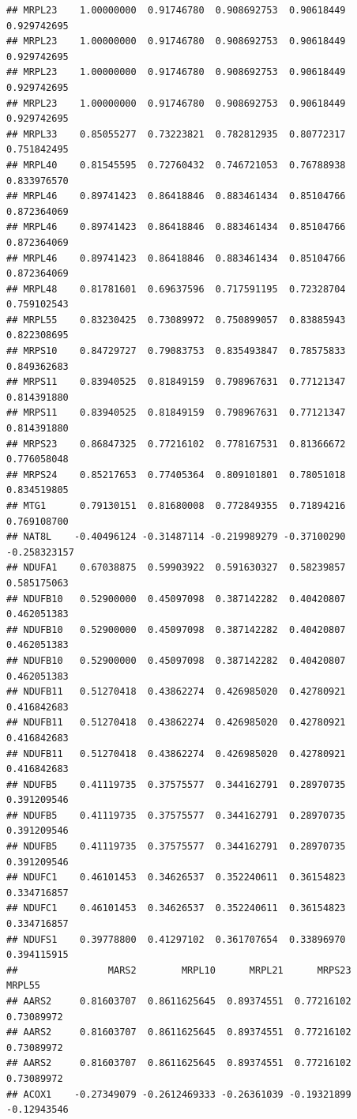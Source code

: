 \documentclass[
]{article}
\begin{document}
\begin{verbatim}
## MRPL23    1.00000000  0.91746780  0.908692753  0.90618449  0.929742695
## MRPL23    1.00000000  0.91746780  0.908692753  0.90618449  0.929742695
## MRPL23    1.00000000  0.91746780  0.908692753  0.90618449  0.929742695
## MRPL23    1.00000000  0.91746780  0.908692753  0.90618449  0.929742695
## MRPL33    0.85055277  0.73223821  0.782812935  0.80772317  0.751842495
## MRPL40    0.81545595  0.72760432  0.746721053  0.76788938  0.833976570
## MRPL46    0.89741423  0.86418846  0.883461434  0.85104766  0.872364069
## MRPL46    0.89741423  0.86418846  0.883461434  0.85104766  0.872364069
## MRPL46    0.89741423  0.86418846  0.883461434  0.85104766  0.872364069
## MRPL48    0.81781601  0.69637596  0.717591195  0.72328704  0.759102543
## MRPL55    0.83230425  0.73089972  0.750899057  0.83885943  0.822308695
## MRPS10    0.84729727  0.79083753  0.835493847  0.78575833  0.849362683
## MRPS11    0.83940525  0.81849159  0.798967631  0.77121347  0.814391880
## MRPS11    0.83940525  0.81849159  0.798967631  0.77121347  0.814391880
## MRPS23    0.86847325  0.77216102  0.778167531  0.81366672  0.776058048
## MRPS24    0.85217653  0.77405364  0.809101801  0.78051018  0.834519805
## MTG1      0.79130151  0.81680008  0.772849355  0.71894216  0.769108700
## NAT8L    -0.40496124 -0.31487114 -0.219989279 -0.37100290 -0.258323157
## NDUFA1    0.67038875  0.59903922  0.591630327  0.58239857  0.585175063
## NDUFB10   0.52900000  0.45097098  0.387142282  0.40420807  0.462051383
## NDUFB10   0.52900000  0.45097098  0.387142282  0.40420807  0.462051383
## NDUFB10   0.52900000  0.45097098  0.387142282  0.40420807  0.462051383
## NDUFB11   0.51270418  0.43862274  0.426985020  0.42780921  0.416842683
## NDUFB11   0.51270418  0.43862274  0.426985020  0.42780921  0.416842683
## NDUFB11   0.51270418  0.43862274  0.426985020  0.42780921  0.416842683
## NDUFB5    0.41119735  0.37575577  0.344162791  0.28970735  0.391209546
## NDUFB5    0.41119735  0.37575577  0.344162791  0.28970735  0.391209546
## NDUFB5    0.41119735  0.37575577  0.344162791  0.28970735  0.391209546
## NDUFC1    0.46101453  0.34626537  0.352240611  0.36154823  0.334716857
## NDUFC1    0.46101453  0.34626537  0.352240611  0.36154823  0.334716857
## NDUFS1    0.39778800  0.41297102  0.361707654  0.33896970  0.394115915
##                MARS2        MRPL10      MRPL21      MRPS23      MRPL55
## AARS2     0.81603707  0.8611625645  0.89374551  0.77216102  0.73089972
## AARS2     0.81603707  0.8611625645  0.89374551  0.77216102  0.73089972
## AARS2     0.81603707  0.8611625645  0.89374551  0.77216102  0.73089972
## ACOX1    -0.27349079 -0.2612469333 -0.26361039 -0.19321899 -0.12943546

\end{verbatim}
\end{document}
